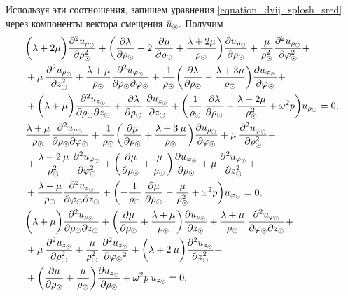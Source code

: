 Используя эти соотношения, запишем уравнения \eqref{equation_dvij_splosh_sred} через компоненты вектора смещения $\bar{u}_\circledcirc.$ Получим
\begin{equation}\label{equation_otn_u}
\begin{aligned}
&\biggl(\lambda+2\mu\biggr)\frac{\partial^2u_{\rho_\odot}}{\partial \rho^2_\odot}+\biggl(\frac{\partial\lambda}{\partial \rho_\odot}+2\:\frac{\partial\mu}{\partial \rho_\odot}+\frac{\lambda+2\mu}{\rho_\odot}\biggr)\frac{\partial u_{\rho_\odot}}{\partial \rho_\odot}+\frac{\mu}{\rho^2_\odot}\frac{\partial^2 u_{\rho_\odot}}{\partial \varphi^2_\odot}+\\
&+\mu\:\frac{\partial^2 u_{\rho_\odot}}{\partial z^2_\odot}+\frac{\lambda+\mu}{\rho_\odot}\frac{\partial^2 u_{\varphi_\odot}}{\partial \rho_\odot\partial\varphi_\odot}+\frac{1}{\rho_\odot}\biggl(\frac{\partial\lambda}{\partial \rho_\odot}-\frac{\lambda+3\mu}{\rho_\odot}\biggr)\frac{\partial u_{\varphi_\odot}}{\partial\varphi_\odot}+\\
&+\biggl(\lambda+\mu\biggr)\frac{\partial^2 u_{z_\odot}}{\partial \rho_\odot\partial z_\odot}+\frac{\partial\lambda}{\partial \rho_\odot}\:\frac{\partial u_{z_\odot}}{\partial z_\odot}+\biggl(\frac{1}{\rho_\odot}\:\frac{\partial\lambda}{\partial \rho_\odot}-\frac{\lambda+2\mu}{\rho^2_\odot}+\omega^2 p\biggr)u_{\rho_\odot}=0,\\
&\frac{\lambda+\mu}{\rho_\odot}\frac{\partial^2u_{\rho_\odot}}{\partial \rho_\odot\partial\varphi_\odot}+\frac{1}{\rho_\odot}\biggl(\frac{\partial\mu}{\partial \rho_\odot}+\frac{\lambda+3\:\mu}{\rho_\odot}\biggr)\frac{\partial u_{\rho_\odot}}{\partial\varphi_\odot}+\mu\:\frac{\partial^2 u_{\varphi_\odot}}{\partial \rho^2_\odot}+\\
&+\frac{\lambda+2\:\mu}{\rho^2_\odot}\:\frac{\partial^2 u_{\varphi_\odot}}{\partial \varphi^2_\odot}+\biggl(\frac{\partial\mu}{\partial \rho_\odot}+\frac{\mu}{\rho_\odot}\biggr)\frac{\partial u_{\varphi_\odot}}{\partial \rho_\odot}+\mu\:\frac{\partial^2 u_{\varphi_\odot}}{\partial z^2_\odot}+\\
&+\frac{\lambda+\mu}{\rho_\odot}\frac{\partial^2 u_{z_\odot}}{\partial \varphi_\odot\partial z_\odot}+\biggl(-\frac{1}{\rho_\odot}\:\frac{\partial\mu}{\partial \rho_\odot}-\frac{\mu}{\rho^2_\odot}+\omega^2 p\biggr)u_{\varphi_\odot}=0,\\
&\biggl(\lambda+\mu\biggr)\frac{\partial^2u_{\rho_\odot}}{\partial \rho_\odot\partial z_\odot}+\biggl(\frac{\partial\mu}{\partial \rho_\odot}+\frac{\lambda+\mu}{\rho_\odot}\biggr)\frac{\partial u_{\rho_\odot}}{\partial z_\odot}+\frac{\lambda+\mu}{\rho_\odot}\:\frac{\partial^2 u_{\varphi_\odot}}{\partial \varphi_\odot\partial z_\odot}+\\
&+\mu\:\frac{\partial^2 u_{z_\odot}}{\partial \rho^2_\odot}+\frac{\mu}{\rho^2_\odot}\:\frac{\partial^2 u_{z_\odot}}{\partial {\varphi_\odot}^2}+\biggl(\lambda+2\:\mu\biggr)\frac{\partial^2 u_{z_\odot}}{\partial z^2_\odot}+\\
&+\biggl(\frac{\partial\mu}{\partial \rho_\odot}+\frac{\mu}{\rho_\odot}\biggr)\frac{\partial u_{z_\odot}}{\partial \rho_\odot}+\omega^2 p\:u_{z_\odot}=0.
\end{aligned}
\end{equation}


